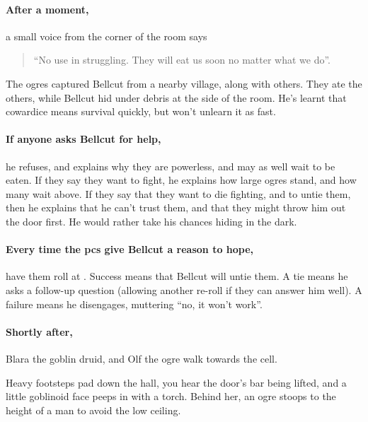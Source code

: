 \begin{multicols}{2}
\paragraph{After a moment,}
a small voice from the corner of the room says

\begin{quotation}
  ``No use in struggling.
  They will eat us soon no matter what we do''.
\end{quotation}

\noindent
The ogres captured Bellcut from a nearby village, along with others.
They ate the others, while Bellcut hid under debris at the side of the room.
He's learnt that cowardice means survival quickly, but won't unlearn it as fast.

\firstPrisoner

\paragraph{If anyone asks Bellcut for help,}
he refuses, and explains why they are powerless, and may as well wait to be eaten.
If they say they want to fight, he explains how large ogres stand, and how many wait above.
If they say that they want to die fighting, and to untie them, then he explains that he can't trust them, and that they might throw him out the door first.
He would rather take his chances hiding in the dark.

\paragraph{Every time the \glspl{pc} give Bellcut a reason to hope,}
have them roll  at \iftoggle{oneshot}{\tn[9]}{\tn[11]}.
Success means that Bellcut will untie them.
A tie means he asks a follow-up question (allowing another re-roll if they can answer him well).
A failure means he disengages, muttering ``no, it won't work''.

\paragraph{Shortly after,}
Blara the goblin druid, and Olf the ogre walk towards the cell.

\begin{boxtext}

  Heavy footsteps pad down the hall, you hear the door's bar being lifted, and a little goblinoid face peeps in with a torch.
  Behind her, an ogre stoops to the height of a man to avoid the low ceiling.


\end{boxtext}
\end{multicols}

